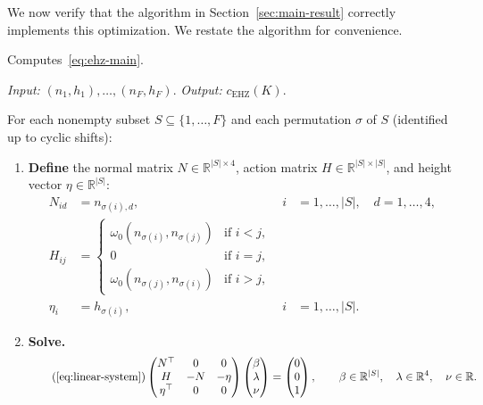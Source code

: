 We now verify that the algorithm in
Section~\ref{sec:main-result} correctly implements this
optimization. We restate the algorithm for convenience.

\begin{algorithm*}
Computes~\eqref{eq:ehz-main}.

\smallskip\noindent
\emph{Input:} $(n_1, h_1), \ldots, (n_F, h_F)$.
\quad
\emph{Output:} $c_{\mathrm{EHZ}}(K)$.

\smallskip\noindent
For each nonempty subset $S \subseteq \{1, \ldots, F\}$
and each permutation $\sigma$ of $S$
(identified up to cyclic shifts):

\begin{enumerate}
\item \textbf{Define}
  the normal matrix $N \in \mathbb{R}^{|S| \times 4}$,
  action matrix $H \in \mathbb{R}^{|S| \times |S|}$,
  and height vector $\eta \in \mathbb{R}^{|S|}$:
  \begin{align*}
    N_{id} &= n_{\sigma(i),d},
      & i &= 1, \ldots, |S|, \quad d = 1, \ldots, 4, \\
    H_{ij} &= \begin{cases}
      \omega_0(n_{\sigma(i)}, n_{\sigma(j)}) & \text{if } i < j, \\
      0 & \text{if } i = j, \\
      \omega_0(n_{\sigma(j)}, n_{\sigma(i)}) & \text{if } i > j,
    \end{cases} \\
    \eta_i &= h_{\sigma(i)},
      & i &= 1, \ldots, |S|.
  \end{align*}

\item \textbf{Solve.}
  \begin{equation}\tag{\ref{eq:linear-system}}
    \begin{pmatrix} N^\top & 0 & 0 \\ H & -N & -\eta \\ \eta^\top & 0 & 0 \end{pmatrix}
    \begin{pmatrix} \beta \\ \lambda \\ \nu \end{pmatrix}
    = \begin{pmatrix} 0 \\ 0 \\ 1 \end{pmatrix},
    \qquad
    \beta \in \mathbb{R}^{|S|}, \quad \lambda \in \mathbb{R}^4, \quad \nu \in \mathbb{R}.
  \end{equation}


\end{enumerate}
\end{algorithm*}
